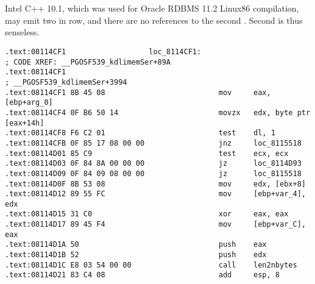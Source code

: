\documentclass[11pt,a4paper,oneside]{book}
\begin{document}
\label{anomaly:Intel}
\section{}
\index{\CompilerAnomaly}

{Intel C++ 10.1, which was used for Oracle RDBMS 11.2 Linux86 compilation, may emit two \JZ in row,
and there are no references to the second \JZ. Second \JZ is thus senseless.}

\begin{lstlisting}[caption=\IFRU{kdli.o из}{kdli.o from} libserver11.a]
.text:08114CF1                   loc_8114CF1:                            ; CODE XREF: __PGOSF539_kdlimemSer+89A
.text:08114CF1                                                           ; __PGOSF539_kdlimemSer+3994
.text:08114CF1 8B 45 08                          mov     eax, [ebp+arg_0]
.text:08114CF4 0F B6 50 14                       movzx   edx, byte ptr [eax+14h]
.text:08114CF8 F6 C2 01                          test    dl, 1
.text:08114CFB 0F 85 17 08 00 00                 jnz     loc_8115518
.text:08114D01 85 C9                             test    ecx, ecx
.text:08114D03 0F 84 8A 00 00 00                 jz      loc_8114D93
.text:08114D09 0F 84 09 08 00 00                 jz      loc_8115518
.text:08114D0F 8B 53 08                          mov     edx, [ebx+8]
.text:08114D12 89 55 FC                          mov     [ebp+var_4], edx
.text:08114D15 31 C0                             xor     eax, eax
.text:08114D17 89 45 F4                          mov     [ebp+var_C], eax
.text:08114D1A 50                                push    eax
.text:08114D1B 52                                push    edx
.text:08114D1C E8 03 54 00 00                    call    len2nbytes
.text:08114D21 83 C4 08                          add     esp, 8
\end{lstlisting}
\end{document}
